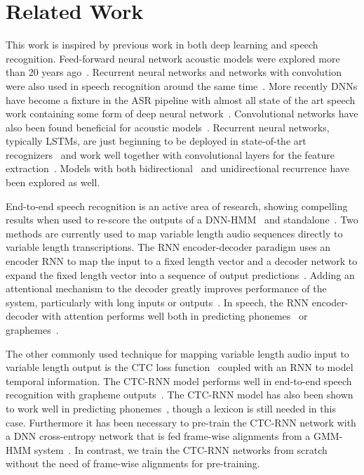 \section{Related Work}
 \label{sec:scaling_asr:related}

This work is inspired by previous work in both deep learning and speech
recognition. Feed-forward neural network acoustic models were explored more
than 20 years ago~\cite{bourlard93, renals1994, ellis1999}. Recurrent neural
networks and networks with convolution were also used in speech recognition
around the same time~\cite{robinson1996, waibel1989}. More recently DNNs have
become a fixture in the ASR pipeline with almost all state of the art speech
work containing some form of deep neural network~\cite{mohamed2011, hinton2012,
dahl2011a, dahl2011, jaitly2012, seide2011}. Convolutional networks have also
been found beneficial for acoustic models~\cite{abdelhamid2012,
sainath2013deep}. Recurrent neural networks, typically LSTMs, are just
beginning to be deployed in state-of-the art recognizers~\cite{graves2013,
sak2014, sak2014b} and work well together with convolutional layers for the
feature extraction~\cite{sainath2015}. Models with both
bidirectional~\cite{graves2013} and unidirectional recurrence have been
explored as well.

End-to-end speech recognition is an active area of research, showing compelling
results when used to re-score the outputs of a DNN-HMM~\cite{graves2014} and
standalone~\cite{hannun2014deepspeech}. Two methods are currently used to map
variable length audio sequences directly to variable length transcriptions. The
RNN encoder-decoder paradigm uses an encoder RNN to map the input to a fixed
length vector and a decoder network to expand the fixed length vector into a
sequence of output predictions~\cite{cho2014, sutskever2014}. Adding an
attentional mechanism to the decoder greatly improves performance of the
system, particularly with long inputs or outputs~\cite{bahdanau2014}. In
speech, the RNN encoder-decoder with attention performs well both in predicting
phonemes~\cite{chorowski2014} or graphemes~\cite{bahdanau2016, chan2016}. 

The other commonly used technique for mapping variable length audio input to
variable length output is the CTC loss function~\cite{graves2006} coupled with
an RNN to model temporal information. The CTC-RNN model performs well in
end-to-end speech recognition with grapheme outputs~\cite{graves2014,
hannun2014firstpass, hannun2014deepspeech, maas2015}. The CTC-RNN model has
also been shown to work well in predicting phonemes~\cite{miao2015, sak2015},
though a lexicon is still needed in this case.  Furthermore it has been
necessary to pre-train the CTC-RNN network with a DNN cross-entropy network
that is fed frame-wise alignments from a GMM-HMM system~\cite{sak2015}. In
contrast, we train the CTC-RNN networks from scratch without the need of
frame-wise alignments for pre-training.


